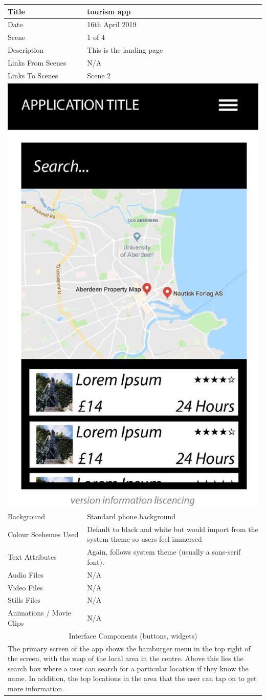 \hspace{-1cm}
	\centering
	\begin{tabular}{p{4cm}p{10cm}}
		\hline
		Title & tourism app \\
		\hline
		Date & 16th April 2019 \\
		\hline
		Scene & 1 of 4 \\
		\hline
		Description & This is the landing page \\
		\hline
		Links From Scenes & N/A \\
		\hline
		Links To Scenes & Scene 2 \\
		\hline
		\multicolumn{2}{c}{\includegraphics[width=0.5\linewidth]{images/screen0.jpg}} \\
		\hline
		Background & Standard phone background \\
		\hline
		Colour Scehemes Used & Default to black and white but would import from the system theme so users feel immersed \\
		\hline
		Text Attributes & Again, follows system theme (usually a sans-serif font). \\
		\hline
		Audio Files & N/A \\
		\hline
		Video Files & N/A \\
		\hline
		Stills Files & N/A \\
		\hline
		Animations / Movie Clips & N/A \\
		\hline
		\multicolumn{2}{c}{Interface Components (buttons, widgets)} \\
		\hline
		\multicolumn{2}{p{14cm}}{The primary screen of the app shows the hamburger menu in the top right of the screen, with the map of the local area in the centre. Above this lies the search box where a user can search for a particular location if they know the name. In addition, the top locations in the area that the user can tap on to get more information.} \\
		\hline
	\end{tabular}
